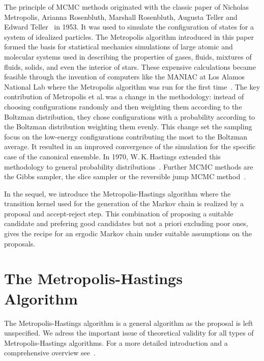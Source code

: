 The principle of MCMC methods originated with the classic paper of Nicholas Metropolis, Arianna Rosenbluth, Marshall Rosenbluth, Augusta Teller and Edward Teller~\autocite{Metropolis1953} in 1953. It was used to simulate the configuration of states for a system of idealized particles. The Metropolis algorithm introduced in this paper formed the basis for statistical mechanics simulations of large atomic and molecular systems used in describing the properties of gases, fluids, mixtures of fluids, solids, and even the interior of stars. These expensive calculations became feasible through the invention of computers like the MANIAC at Los Alamos National Lab where the Metropolis algorithm was run for the first time~\autocites{MCAtWork1987, UlamNeumannMC1987}. 
The key contribution of Metropolis et al.\,was a change in the methodology: instead of choosing configurations randomly and then weighting them according to the Boltzman distribution, they chose configurations with a probability according to the Boltzman distribution weighting them evenly. This change set the sampling focus on the low-energy configurations contributing the most to the Boltzman average. It resulted in an improved convergence of the simulation for the specific case of the canonical ensemble. In 1970, W.\,K.\,Hastings extended this methodology to general probability distributions~\autocite{Hastings1970}. Further MCMC methods are the Gibbs sampler, the slice sampler or the reversible jump MCMC method~\autocite{Robert2005}.


In the sequel, we introduce the Metropolis-Hastings algorithm where the transition kernel used for the generation of the Markov chain is realized by a proposal and accept-reject step. This combination of proposing a suitable candidate and prefering good candidates but not a priori excluding poor ones, gives the recipe for an ergodic Markov chain under suitable assumptions on the proposals.

\section{The Metropolis-Hastings Algorithm}
\label{MH-TheMetropolis-HastingsAlgo}

The Metropolis-Hastings algorithm is a general algorithm as the proposal is left unspecified. We  adress the important issue of theoretical validity for all types of Metropolis-Hastings algorithms. For a more detailed introduction and a comprehensive overview see~\autocite{Robert2005}.

